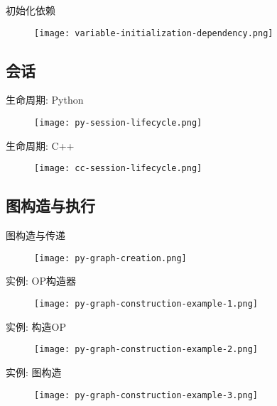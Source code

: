 \begin{frame}{初始化依赖}
  \begin{figure}
    \centering
    \texttt{[image: variable-initialization-dependency.png]}
  \end{figure}
\end{frame}

\subsection{会话}

\begin{frame}{生命周期: Python}
  \begin{figure}
    \centering
    \texttt{[image: py-session-lifecycle.png]}
  \end{figure}
\end{frame}

\begin{frame}{生命周期: C++}
  \begin{figure}
    \centering
    \texttt{[image: cc-session-lifecycle.png]}
  \end{figure}
\end{frame}

\subsection{图构造与执行}

\begin{frame}{图构造与传递}
  \begin{figure}
    \centering
    \texttt{[image: py-graph-creation.png]}
  \end{figure}
\end{frame}

\begin{frame}{实例: OP构造器}
  \begin{figure}
    \centering
    \texttt{[image: py-graph-construction-example-1.png]}
  \end{figure}
\end{frame}

\begin{frame}{实例: 构造OP}
  \begin{figure}
    \centering
    \texttt{[image: py-graph-construction-example-2.png]}
  \end{figure}
\end{frame}

\begin{frame}{实例: 图构造}
  \begin{figure}
    \centering
    \texttt{[image: py-graph-construction-example-3.png]}
  \end{figure}
\end{frame}
